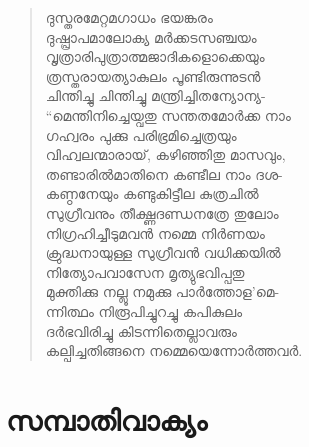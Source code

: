 \begin{verse}
ദുസ്തരമേറ്റമഗാധം ഭയങ്കരം\\
ദുഷ്പ്രാപമാലോക്യ മര്‍ക്കടസഞ്ചയം\\
വൃത്രാരിപുത്രാത്മജാദികളൊക്കെയും\\
ത്രസ്തരായത്യാകുലം പൂണ്ടിരുന്നുടന്‍\\
ചിന്തിച്ചു ചിന്തിച്ചു മന്ത്രിച്ചിതന്യോന്യ-\\
“മെന്തിനിച്ചെയ്വതു സന്തതമോര്‍ക്ക നാം\\
ഗഹ്വരം പുക്കു പരിഭ്രമിച്ചെത്രയും\\
വിഹ്വലന്മാരായ്, കഴിഞ്ഞിതു മാസവും,\\
തണ്ടാരില്‍മാതിനെ കണ്ടീല നാം ദശ-\\
കണ്ഠനേയും കണ്ടുകിട്ടീല കുത്രചില്‍\\
സുഗ്രീവനും തീക്ഷ്ണദണ്ഡനത്രേ തുലോം\\
നിഗ്രഹിച്ചീടുമവന്‍ നമ്മെ നിര്‍ണയം\\
ക്രുദ്ധനായുള്ള സുഗ്രീവന്‍ വധിക്കയില്‍\\
നിത്യോപവാസേന മൃത്യുഭവിപ്പതു\\
മുക്തിക്കു നല്ലൂ നമുക്കു പാര്‍ത്തോള’മെ-\\
ന്നിത്ഥം നിരൂപിച്ചുറച്ചു കപികുലം\\
ദര്‍ഭവിരിച്ചു കിടന്നിതെല്ലാവരും\\
കല്പിച്ചതിങ്ങനെ നമ്മെയെന്നോര്‍ത്തവര്‍.
\end{verse}


\section{സമ്പാതിവാക്യം}

